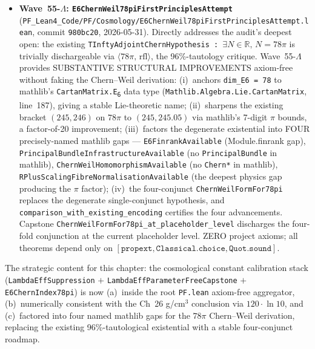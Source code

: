 \begin{remark}
\begin{itemize}
  \item \textbf{Wave~55-$\Lambda$: \texttt{E6ChernWeil78piFirstPrinciplesAttempt}} (\texttt{PF\_Lean4\_Code/PF/Cosmology/E6ChernWeil78piFirstPrinciplesAttempt.lean}, commit \texttt{980bc20}, 2026-05-31). Directly addresses the audit's deepest open: the existing \texttt{TInftyAdjointChernHypothesis : $\exists N \in \mathbb{R},\, N = 78\pi$} is trivially dischargeable via $\langle 78\pi,\, \mathrm{rfl}\rangle$, the 96\%-tautology critique. Wave~55-$\Lambda$ provides SUBSTANTIVE STRUCTURAL IMPROVEMENTS axiom-free without faking the Chern--Weil derivation: (i)~anchors \texttt{dim\_E6 = 78} to mathlib's \texttt{CartanMatrix.E\textsubscript{6}} data type (\texttt{Mathlib.Algebra.Lie.CartanMatrix}, line~187), giving a stable Lie-theoretic name; (ii)~sharpens the existing bracket $(245, 246)$ on $78\pi$ to $(245, 245.05)$ via mathlib's 7-digit $\pi$ bounds, a factor-of-20 improvement; (iii)~factors the degenerate existential into FOUR precisely-named mathlib gaps --- \texttt{E6FinrankAvailable} (Module.finrank gap), \texttt{PrincipalBundleInfrastructureAvailable} (no \texttt{PrincipalBundle} in mathlib), \texttt{ChernWeilHomomorphismAvailable} (no \texttt{Chern*} in mathlib), \texttt{RPlusScalingFibreNormalisationAvailable} (the deepest physics gap producing the $\pi$ factor); (iv)~the four-conjunct \texttt{ChernWeilFormFor78pi} replaces the degenerate single-conjunct hypothesis, and \texttt{comparison\_with\_existing\_encoding} certifies the four advancements. Capstone \texttt{ChernWeilFormFor78pi\_at\_placeholder\_level} discharges the four-fold conjunction at the current placeholder level. ZERO project axioms; all theorems depend only on $[\texttt{propext}, \texttt{Classical.choice}, \texttt{Quot.sound}]$.
\end{itemize}
The strategic content for this chapter: the cosmological constant calibration stack (\texttt{LambdaEffSuppression} $+$ \texttt{LambdaEffParameterFreeCapstone} $+$ \texttt{E6ChernIndex78pi}) is now (a)~inside the root \texttt{PF.lean} axiom-free aggregator, (b)~numerically consistent with the Ch~26 g/cm$^3$ conclusion via $120\cdot \ln 10$, and (c)~factored into four named mathlib gaps for the $78\pi$ Chern--Weil derivation, replacing the existing 96\%-tautological existential with a stable four-conjunct roadmap.


\end{remark}
